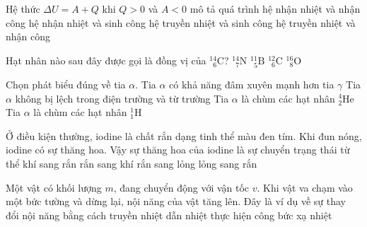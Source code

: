 	\begin{ex}%
		Hệ thức $\Delta U=A+Q$ khi $Q>0$ và $A<0$ mô tả quá trình
		\choice
		{hệ nhận nhiệt và nhận công}
		{\True hệ nhận nhiệt và sinh công}
		{hệ truyền nhiệt và sinh công}
		{hệ truyền nhiệt và nhận công}
	\end{ex}

	\begin{ex}%
		Hạt nhân nào sau đây được gọi là đồng vị của ${}^{14}_{\phantom{1}6}\text{C}$?
		\choice
		{${}^{14}_{\phantom{1}7}\text{N}$}
		{${}^{11}_{\phantom{1}5}\text{B}$}
		{\True ${}^{12}_{\phantom{1}6}\text{C}$}
		{${}^{16}_{\phantom{1}8}\text{O}$}
	\end{ex}

	\begin{ex}%
		Chọn phát biểu đúng về tia $\alpha$.
		\choice
		{Tia $\alpha$ có khả năng đâm xuyên mạnh hơn tia $\gamma$}
		{Tia $\alpha$ không bị lệch trong điện trường và từ trường}
		{\True Tia $\alpha$ là chùm các hạt nhân ${}^4_2\text{He}$}
		{Tia $\alpha$ là chùm các hạt nhân ${}^1_1\text{H}$}
	\end{ex}

	\begin{ex}%
		Ở điều kiện thường, iodine là chất rắn dạng tinh thể màu đen tím. Khi đun nóng, iodine có sự thăng hoa. Vậy sự thăng hoa của iodine là sự chuyển trạng thái từ thể
		\choice
		{khí sang rắn}
		{\True rắn sang khí}
		{rắn sang lỏng}
		{lỏng sang rắn}
	\end{ex}

	\begin{ex}%
		Một vật có khối lượng $m$, đang chuyển động với vận tốc $v$. Khi vật va chạm vào một bức tường và dừng lại, nội năng của vật tăng lên. Đây là ví dụ về sự thay đổi nội năng bằng cách
		\choice
		{truyền nhiệt}
		{dẫn nhiệt}
		{\True thực hiện công}
		{bức xạ nhiệt}
	\end{ex}

